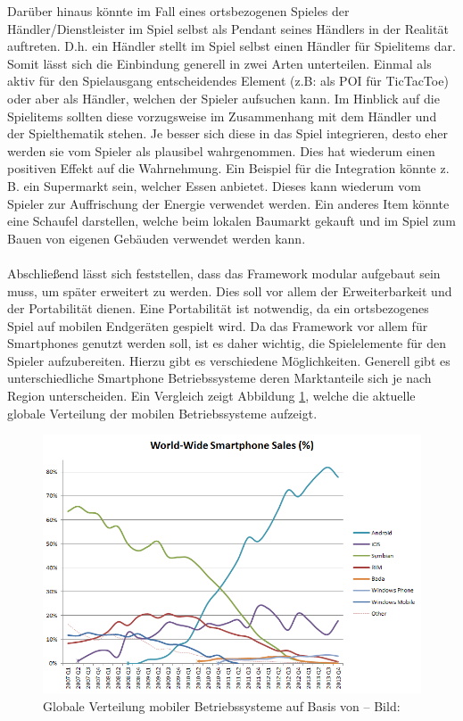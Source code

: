 Darüber hinaus könnte im Fall eines ortsbezogenen Spieles der Händler/Dienstleister im Spiel selbst als Pendant seines Händlers in der Realität auftreten. D.h. ein Händler stellt im Spiel selbst einen Händler für Spielitems dar.
Somit lässt sich die Einbindung generell in zwei Arten unterteilen. Einmal als aktiv für den Spielausgang entscheidendes Element (z.B: als POI für TicTacToe) oder aber als Händler, welchen der Spieler aufsuchen kann.
Im Hinblick auf die Spielitems sollten diese vorzugsweise im Zusammenhang mit dem Händler und der Spielthematik stehen. Je besser sich diese in das Spiel integrieren, desto eher werden sie vom Spieler als plausibel wahrgenommen. Dies hat wiederum einen positiven Effekt auf die Wahrnehmung.
Ein Beispiel für die Integration könnte z.\,B. ein Supermarkt sein, welcher Essen anbietet. Dieses kann wiederum vom Spieler zur Auffrischung der Energie verwendet werden. Ein anderes Item könnte eine Schaufel darstellen, welche beim lokalen Baumarkt gekauft und im Spiel zum Bauen von eigenen Gebäuden verwendet werden kann.
\\\\
Abschließend lässt sich feststellen, dass das Framework modular aufgebaut sein muss, um später erweitert zu werden. Dies soll vor allem der Erweiterbarkeit und der Portabilität dienen. Eine Portabilität ist notwendig, da ein ortsbezogenes Spiel auf mobilen Endgeräten gespielt wird. Da das Framework vor allem für Smartphones genutzt werden soll, ist es daher wichtig, die Spielelemente für den Spieler aufzubereiten. Hierzu gibt es verschiedene Möglichkeiten.
Generell gibt es unterschiedliche Smartphone Betriebssysteme deren Marktanteile sich je nach Region unterscheiden.
Ein Vergleich zeigt Abbildung \ref{img:ch4_img02_marketshare}, welche die aktuelle globale Verteilung der mobilen Betriebssysteme aufzeigt.

\begin{figure}[H]
\begin{center}
\includegraphics[width=140mm]{images/ch4_img02_marketshare.png}
\caption{Globale Verteilung mobiler Betriebssysteme auf Basis von \textcite{Gartner.2013} -- Bild: \cite{Wikipedia.2014}}
\label{img:ch4_img02_marketshare}
\end{center}
\end{figure}

